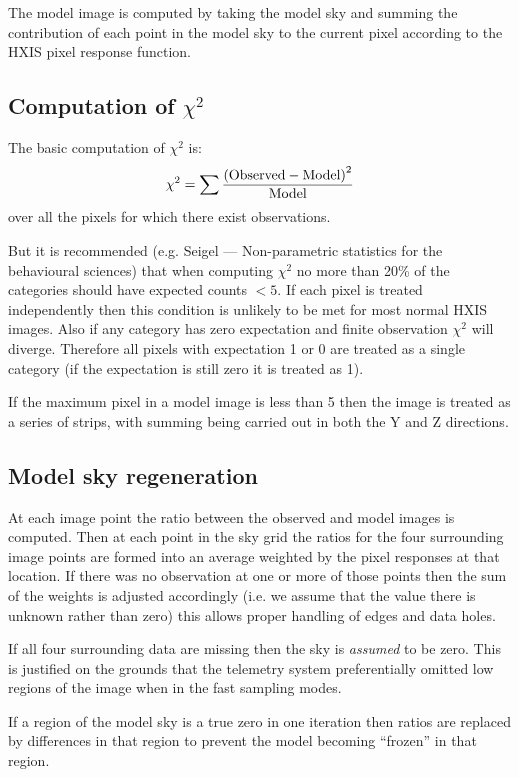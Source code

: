 The model image is computed by taking the model sky and summing the
contribution of each point in the model sky to the current pixel
according to the HXIS pixel response function.

\subsection{Computation of $\chi^2$}

The basic computation of $\chi^2$ is:
$$ \chi^2 = \sum {{\rm (Observed - Model)}^2\over {\rm Model}} $$
over all the pixels for which there exist observations.

But it is recommended (e.g. Seigel --- Non-parametric statistics
for the behavioural
sciences) that when computing $\chi^2$ no more than 20\% of the categories
should have expected counts $< 5$. If each pixel is treated independently
then this condition is unlikely to be met for most normal HXIS images. Also
if any category has zero expectation and finite observation $\chi^2$ will
diverge. Therefore all pixels with expectation 1 or 0
are treated as a single category (if the expectation is still zero
it is treated as 1).

If the maximum pixel in a model image is less than
5 then the image is treated as a series of strips, with summing being
carried out in both the Y and Z directions.

\subsection{Model sky regeneration}

At each image point the ratio between the observed and model images
is computed. Then
at each point in the sky grid the ratios for the four surrounding
image points are formed into an average weighted by the pixel responses at that
location.
If there was no observation at one or more of those points then the
sum of the weights is adjusted accordingly (i.e. we assume that the value
there is unknown rather than zero) this allows proper handling
of edges and data holes.

If all four surrounding data are missing then the sky is {\em assumed}
to be zero. This is justified on the grounds that the telemetry system
preferentially omitted low regions of the image when in the fast
sampling modes.

If a region of the model sky is a true zero in one iteration then ratios are
replaced by differences in that region to prevent the model becoming ``frozen''
in that region.

